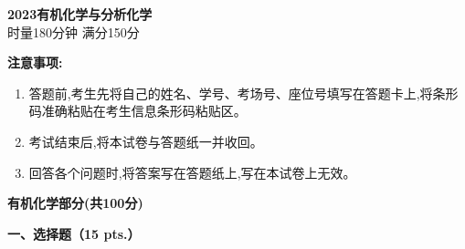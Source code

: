 \begin{center}
    {\LARGE \textbf{2023有机化学与分析化学}} \\[2ex]
    {\large 时量180分钟 \quad 满分150分}
\end{center}

\vspace{0.5cm}
\noindent\textbf{注意事项:}
\begin{enumerate}[label=\arabic*., parsep=0pt, itemsep=0pt]
    \item 答题前,考生先将自己的姓名、学号、考场号、座位号填写在答题卡上,将条形码准确粘贴在考生信息条形码粘贴区。
    \item 考试结束后,将本试卷与答题纸一并收回。
    \item 回答各个问题时,将答案写在答题纸上,写在本试卷上无效。
\end{enumerate}

\vspace{1cm}
\begin{center}
    {\Large \textbf{有机化学部分(共100分)}}
\end{center}

\vspace{0.5cm}
\noindent\textbf{一、选择题（15 pts.）}

